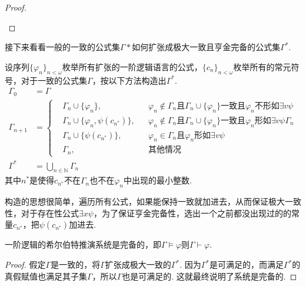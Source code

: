 \begin{proof}
\begin{itemize}
    \end{itemize}

\end{proof}

接下来看看一般的一致的公式集$\Gamma*$如何扩张成极大一致且亨金完备的公式集$\Gamma^*$.

\begin{reference}
    设序列$\{\varphi_n\}_{n < \omega}$枚举所有扩张的一阶逻辑语言的公式，$\{c_n\}_{n < \omega}$枚举所有的常元符号，对于一致的公式集$\Gamma$，按以下方法构造出$\Gamma^*$.
    \begin{align*}
        \Gamma_0 &= \Gamma \\
        \Gamma_{n+1} &= 
            \left\{ 
                \begin{aligned} 
                    & \Gamma_n \cup \{\varphi_n\}, && \varphi_n \not \in \Gamma_n\mbox{且}\Gamma_n \cup \{\varphi_n\}\mbox{一致且}\varphi_n\mbox{不形如}\exists v \psi \\ 
                    & \Gamma_n \cup \{\varphi_n, \psi(c_{n^*})\}, && \varphi_n \not \in \Gamma_n\mbox{且}\Gamma_n \cup \{\varphi_n\}\mbox{一致且}\varphi_n\mbox{形如}\exists v \psi \Gamma_n \\
                    & \Gamma_n \cup \{\psi(c_{n^*})\}, && \varphi_n \in \Gamma_n \mbox{且}\varphi_n\mbox{形如}\exists v \psi \\
                    & \Gamma_n, && \mbox{其他情况}
                \end{aligned} 
            \right. \\
        \Gamma^* &= \bigcup_{n \in \mathbb{N}} \Gamma_n
    \end{align*}
    其中$n^*$是使得$c_{n^*}$不在$\Gamma_n$也不在$\varphi_n$中出现的最小整数.
\end{reference}

构造的思想很简单，遍历所有公式，如果能保持一致就加进去，从而保证极大一致性，对于存在性公式$\exists x \psi$，为了保证亨金完备性，选出一个之前都没出现过的的常量$c_{n^*}$，把$\psi(c_{n^*})$加进去.

\begin{theorem}{}
    一阶逻辑的希尔伯特推演系统是完备的，即$\Gamma \vDash \varphi$则$\Gamma \vdash \varphi$.
\end{theorem}

\begin{proof}
    假定\(\Gamma\)是一致的，将\(\Gamma\)扩张成极大一致的\(\Gamma^*\). 因为\(\Gamma^*\)是可满足的，而满足\(\Gamma^*\)的真假赋值也满足其子集\(\Gamma\)，所以\(\Gamma\)也是可满足的. 这就最终说明了系统是完备的.
\end{proof}

